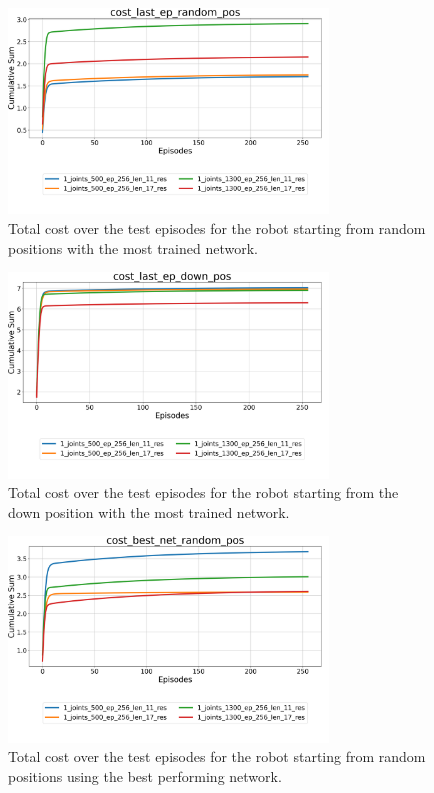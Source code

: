 \documentclass[twocolumn, a4paper]{article}
\begin{document}
\begin{figure}[H]
	\centering
	\includegraphics[width=8.5cm]{"../Figures/Summary_cost_last_ep_random_pos_1J.png"}
	\caption{Total cost over the test episodes for the robot starting
			 from random positions with the most trained network.}
	\label{fig:Test_1_last_ep_random_pos}
\end{figure}

\begin{figure}[H]
	\centering
	\includegraphics[width=8.5cm]{"../Figures/Summary_cost_last_ep_down_pos_1J.png"}
	\caption{Total cost over the test episodes for the robot starting
			 from the down position with the most trained network.}
	\label{fig:Test_1_last_ep_down_pos}
\end{figure}

\begin{figure}[H]
	\centering
	\includegraphics[width=8.5cm]{"../Figures/Summary_cost_best_net_random_pos_1J.png"}
	\caption{Total cost over the test episodes for the robot starting from
			 random positions using the best performing network.}
	\label{fig:Test_1_best_net_random_pos}
\end{figure}
\end{document}
